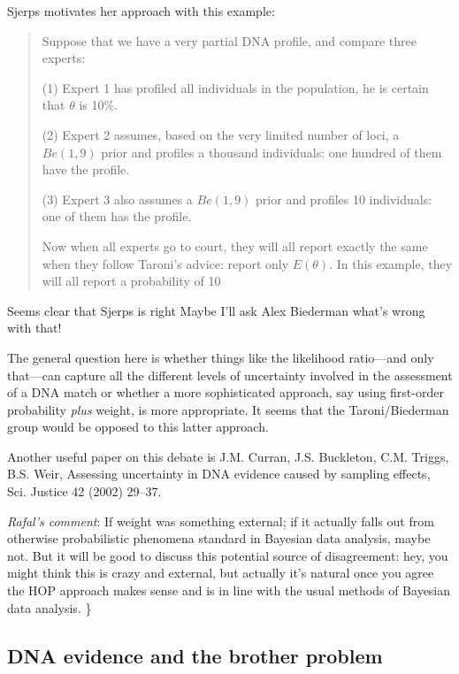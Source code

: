 \documentclass[
  10pt,
  dvipsnames,enabledeprecatedfontcommands]{scrartcl}
\begin{document}
Sjerps motivates her approach with this example:

\begin{quote}
Suppose that we have a very partial DNA profile, and compare three experts:

   (1) Expert 1 has profiled all individuals in the population, he is certain that $\theta$ is 10\%.

   (2) Expert 2 assumes, based on the very limited number of loci, a $Be(1,9)$ prior and profiles a
thousand individuals: one hundred of them have the profile.

   (3) Expert 3 also assumes a $Be(1,9)$ prior and profiles 10 individuals: one of them has the profile.

Now when all experts go to court, they will all report exactly the same when they follow Taroni’s
advice: report only $E(\theta)$. In this example, they will all report a probability of 10%
\end{quote}

Seems clear that Sjerps is right Maybe I'll ask Alex Biederman what's
wrong with that!

The general question here is whether things like the likelihood
ratio---and only that---can capture all the different levels of
uncertainty involved in the assessment of a DNA match or whether a more
sophisticated approach, say using first-order probability \textit{plus}
weight, is more appropriate. It seems that the Taroni/Biederman group
would be opposed to this latter approach.

Another useful paper on this debate is J.M. Curran, J.S. Buckleton, C.M.
Triggs, B.S. Weir, Assessing uncertainty in DNA evidence caused by
sampling effects, Sci. Justice 42 (2002) 29--37.

\emph{Rafal's comment}: If weight was something external; if it actually
falls out from otherwise probabilistic phenomena standard in Bayesian
data analysis, maybe not. But it will be good to discuss this potential
source of disagreement: hey, you might think this is crazy and external,
but actually it's natural once you agree the HOP approach makes sense
and is in line with the usual methods of Bayesian data analysis. \}

\hypertarget{dna-evidence-and-the-brother-problem}{%
\subsection{DNA evidence and the brother
problem}\label{dna-evidence-and-the-brother-problem}}
\end{document}
